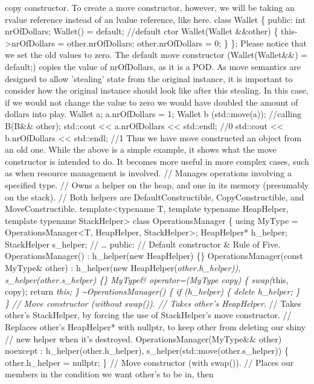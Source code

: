 copy constructor. To create a move constructor, however, we will be
taking an rvalue reference instead of an lvalue reference, like here.
class Wallet \{ public: int nrOfDollars; Wallet() = default; //default
ctor Wallet(Wallet \&\&other) \{ this-\textgreater nrOfDollars =
other.nrOfDollars; other.nrOfDollars = 0; \} \}; Please notice that we
set the old values to zero. The default move constructor
(Wallet(Wallet\&\&) = default;) copies the value of nrOfDollars, as it
is a POD. As move semantics are designed to allow 'stealing' state from
the original instance, it is important to consider how the original
instance should look like after this stealing. In this case, if we would
not change the value to zero we would have doubled the amount of dollars
into play. Wallet a; a.nrOfDollars = 1; Wallet b (std::move(a));
//calling B(B\&\& other); std::cout \textless\textless{} a.nrOfDollars
\textless\textless{} std::endl; //0 std::cout \textless\textless{}
b.nrOfDollars \textless\textless{} std::endl; //1 Thus we have move
constructed an object from an old one. While the above is a simple
example, it shows what the move constructor is intended to do. It
becomes more useful in more complex cases, such as when resource
management is involved. // Manages operations involving a specified
type. // Owns a helper on the heap, and one in its memory (presumably on
the stack). // Both helpers are DefaultConstructible, CopyConstructible,
and MoveConstructible. template\textless typename T, template typename
HeapHelper, template typename StackHelper\textgreater{} class
OperationsManager \{ using MyType = OperationsManager\textless T,
HeapHelper, StackHelper\textgreater; HeapHelper* h\_helper; StackHelper
s\_helper; // \ldots{} public: // Default constructor \& Rule of Five.
OperationsManager() : h\_helper(new HeapHelper) \{\}
OperationsManager(const MyType\& other) : h\_helper(new
HeapHelper(\emph{other.h\_helper)), s\_helper(other.s\_helper) \{\}
MyType\& operator=(MyType copy) \{ swap(}this, copy); return \emph{this;
\} \textasciitilde OperationsManager() \{ if (h\_helper) \{ delete
h\_helper; \}  \} // Move constructor (without swap()). // Takes
other's HeapHelper}. // Takes other's StackHelper, by forcing the use of
StackHelper's move constructor. // Replaces other's HeapHelper* with
nullptr, to keep other from deleting our shiny // new helper when it's
destroyed. OperationsManager(MyType\&\& other) noexcept :
h\_helper(other.h\_helper), s\_helper(std::move(other.s\_helper)) \{
other.h\_helper = nullptr; \} // Move constructor (with swap()). //
Places our members in the condition we want other's to be in, then
